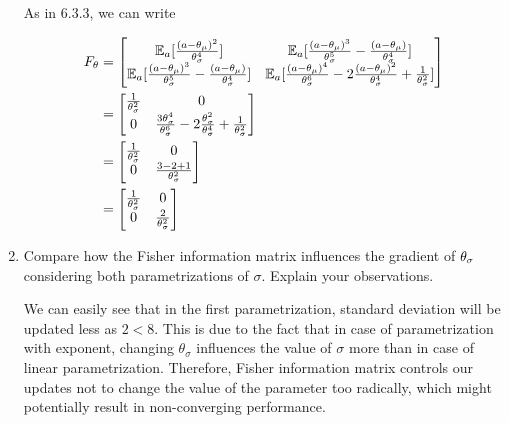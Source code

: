 \documentclass{exam}
\begin{document}
\begin{enumerate}
\begin{solutionorlines}[2in]
            As in 6.3.3, we can write
            
            \begin{align*}
                F_\theta &= \begin{bmatrix}
                    \operatorname*{\mathbb{E}}_a [ \frac{(a - \theta_{\mu})^2}{\theta_{\sigma}^4} ] 
                    & \operatorname*{\mathbb{E}}_a [\frac{(a - \theta_{\mu})^3}{\theta_{\sigma}^5} - \frac{(a - \theta_{\mu})}{\theta_{\sigma}^4}]\\
                    \operatorname*{\mathbb{E}}_a [ \frac{(a - \theta_{\mu})^3}{\theta_{\sigma}^5} - \frac{(a - \theta_{\mu})}{\theta_{\sigma}^4}] 
                    & \operatorname*{\mathbb{E}}_a [\frac{(a - \theta_{\mu})^4}{\theta_{\sigma}^6} - 2\frac{(a - \theta_{\mu})^2}{\theta_{\sigma}^4}  + \frac{1}{\theta_{\sigma}^2}]
                \end{bmatrix} \\
                &= \begin{bmatrix}
                    \frac{1}{\theta_{\sigma}^2}
                    & 0\\
                    0 
                    & \frac{3\theta_{\sigma}^4}{\theta_{\sigma}^6} - 2 \frac{\theta_{\sigma}^2}{\theta_{\sigma}^4} + \frac{1}{\theta_{\sigma}^2}
                \end{bmatrix} \\
                &= \begin{bmatrix}
                    \frac{1}{\theta_{\sigma}^2}
                    & 0\\
                    0 
                    & \frac{3 - 2 + 1}{\theta_{\sigma}^2}
                \end{bmatrix} \\
                &= \begin{bmatrix}
                    \frac{1}{\theta_{\sigma}^2}
                    & 0\\
                    0 
                    & \frac{2}{\theta_{\sigma}^2}
                \end{bmatrix}
            \end{align*}
            
        \end{solutionorlines}
    \item Compare how the Fisher information matrix influences the gradient of $\theta_{\sigma}$ considering both parametrizations of $\sigma$. Explain your observations.
        \begin{solutionorlines}[2in]
                We can easily see that in the first parametrization, standard deviation will be updated less as $2 < 8$. This is due to the fact that in case of parametrization with exponent, changing $\theta_{\sigma}$ influences the value of $\sigma$ more than in case of linear parametrization. Therefore, Fisher information matrix controls our updates not to change the value of the parameter too radically, which might potentially result in non-converging performance.
        \end{solutionorlines}
        

\end{enumerate}
\end{document}
